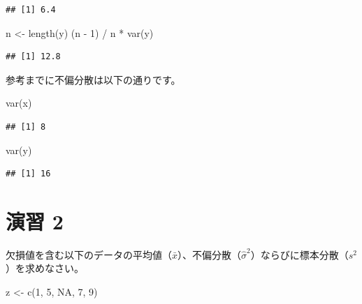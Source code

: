 \documentclass[
  12pt,
]{book}
\newenvironment{Shaded}{\begin{snugshade}}{\end{snugshade}}
\newcommand{\ConstantTok}[1]{\textcolor[rgb]{0.00,0.00,0.00}{#1}}
\newcommand{\DecValTok}[1]{\textcolor[rgb]{0.00,0.00,0.81}{#1}}
\newcommand{\FunctionTok}[1]{\textcolor[rgb]{0.00,0.00,0.00}{#1}}
\newcommand{\NormalTok}[1]{#1}
\newcommand{\OtherTok}[1]{\textcolor[rgb]{0.56,0.35,0.01}{#1}}
\newcommand{\SpecialCharTok}[1]{\textcolor[rgb]{0.00,0.00,0.00}{#1}}
\begin{document}
\begin{verbatim}
## [1] 6.4
\end{verbatim}

\begin{Shaded}
\begin{Highlighting}[]
\NormalTok{n }\OtherTok{\textless{}{-}} \FunctionTok{length}\NormalTok{(y)}
\NormalTok{(n }\SpecialCharTok{{-}} \DecValTok{1}\NormalTok{) }\SpecialCharTok{/}\NormalTok{ n }\SpecialCharTok{*} \FunctionTok{var}\NormalTok{(y)}
\end{Highlighting}
\end{Shaded}

\begin{verbatim}
## [1] 12.8
\end{verbatim}

参考までに不偏分散は以下の通りです。

\begin{Shaded}
\begin{Highlighting}[]
\FunctionTok{var}\NormalTok{(x)}
\end{Highlighting}
\end{Shaded}

\begin{verbatim}
## [1] 8
\end{verbatim}

\begin{Shaded}
\begin{Highlighting}[]
\FunctionTok{var}\NormalTok{(y)}
\end{Highlighting}
\end{Shaded}

\begin{verbatim}
## [1] 16
\end{verbatim}

\hypertarget{ux6f14ux7fd2-2-1}{%
\section*{演習 2}\label{ux6f14ux7fd2-2-1}}

欠損値を含む以下のデータの平均値（\(\bar{x}\)）、不偏分散（\(\hat{\sigma}^2\)）ならびに標本分散（\(s^2\)）を求めなさい。

\begin{Shaded}
\begin{Highlighting}[]
\NormalTok{z }\OtherTok{\textless{}{-}} \FunctionTok{c}\NormalTok{(}\DecValTok{1}\NormalTok{, }\DecValTok{5}\NormalTok{, }\ConstantTok{NA}\NormalTok{, }\DecValTok{7}\NormalTok{, }\DecValTok{9}\NormalTok{)}
\end{Highlighting}
\end{Shaded}
\end{document}
